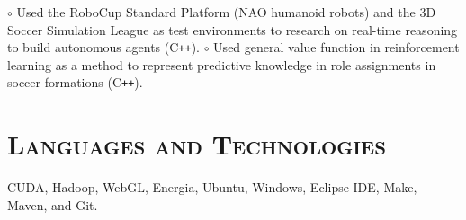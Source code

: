 \begin{resume}
\begin{position}
$\circ$ Used the RoboCup Standard Platform (NAO humanoid robots) and the 3D Soccer Simulation 
League as 
test environments to research on real-time reasoning to build autonomous agents (C\texttt{++}). 
\newline $\circ$  
Used 
general value function in reinforcement learning as a method to  represent predictive knowledge in 
role assignments in soccer formations (C\texttt{++}).
\end{position}













\vspace{-2mm}
\section{\textsc{Languages and Technologies}}

\dates{~}
\begin{position}
CUDA, Hadoop, WebGL, Energia, Ubuntu, Windows, Eclipse IDE, Make, Maven, and
Git.
\end{position}





\end{resume}
